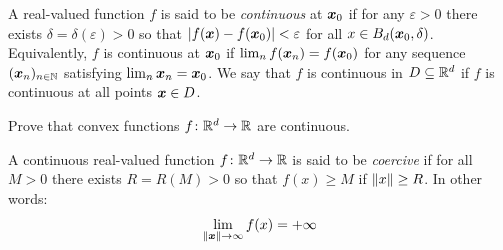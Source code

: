 A real-valued function $f$ is said to be \emph{continuous} at $\boldsymbol{x}_0$ if for
any $\varepsilon>0$ there exists $\delta = \delta(\varepsilon)>0$ so that
$\lvert f(\boldsymbol{x}) - f(\boldsymbol{x}_0) \rvert < \varepsilon$ for all $x \in B_d(\boldsymbol{x}_0, \delta)$.
Equivalently, $f$ is continuous at $\boldsymbol{x}_0$ if $\lim_n f(\boldsymbol{x}_n) = f(\boldsymbol{x}_0)$ for
any sequence $({\boldsymbol{x}}_{n})_{{n}\in\mathbb{N}}$ satisfying $\lim_n \boldsymbol{x}_n = \boldsymbol{x}_0$. We say that
$f$ is continuous in $D \subseteq \mathbb{R}^d$ if $f$ is continuous at all
points $\boldsymbol{x} \in D$.

\begin{problem}\label{problem:ConvexIsContinuous}
Prove that convex functions $f \colon \mathbb{R}^d \to \mathbb{R}$ are continuous.
\end{problem}

A continuous real-valued function $f\colon \mathbb{R}^d \to \mathbb{R}$ is said to be \emph{coercive} if for all $M>0$ there exists $R=R(M)>0$ so that $f(x)\geq M$ if $\lVert x \rVert\geq R$.  In other words:
\begin{equation*}
\lim_{\lVert \boldsymbol{x} \rVert\to \infty} f(x) = +\infty
\end{equation*}

